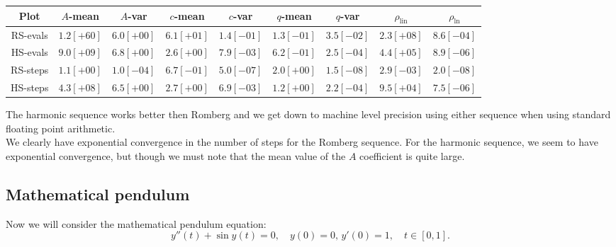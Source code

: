 \begin{table}[H]
    \centering
    \small
    \begin{tabular}{c||c|c|c|c|c|c|c|c}
Plot & \(A\)-mean & \(A\)-var & \(c\)-mean & \(c\)-var & \(q\)-mean & \(q\)-var & \(\rho_{\operatorname{lin}}\) & \(\rho_{\ln}\)\\\hline
\rowcolor{red}
RS-evals & \(1.2[+60]\) & \(6.0[+00]\) & \(6.1[+01]\) & \(1.4[-01]\) & \(1.3[-01]\) & \(3.5[-02]\) & \(2.3[+08]\) & \(8.6[-04]\) \\
\rowcolor{green}
HS-evals & \(9.0[+09]\) & \(6.8[+00]\) & \(2.6[+00]\) & \(7.9[-03]\) & \(6.2[-01]\) & \(2.5[-04]\) & \(4.4[+05]\) & \(8.9[-06]\) \\
\rowcolor{green}
RS-steps & \(1.1[+00]\) & \(1.0[-04]\) & \(6.7[-01]\) & \(5.0[-07]\) & \(2.0[+00]\) & \(1.5[-08]\) & \(2.9[-03]\) & \(2.0[-08]\) \\
\rowcolor{green}
HS-steps & \(4.3[+08]\) & \(6.5[+00]\) & \(2.7[+00]\) & \(6.9[-03]\) & \(1.2[+00]\) & \(2.2[-04]\) & \(9.5[+04]\) & \(7.5[-06]\) \\
    \end{tabular}
    \label{tab:my_label}
\end{table}

The harmonic sequence works better then Romberg and we get down to machine level precision using either sequence when using standard floating point arithmetic.\\

We clearly have exponential convergence in the number of steps for the Romberg sequence. For the harmonic sequence, we seem to have exponential convergence, but though we must note that the mean value of the \(A\) coefficient is quite large.

\subsection{Mathematical pendulum}

Now we will consider the mathematical pendulum equation:
\begin{equation}
y''(t) + \sin y(t) = 0,\quad y(0) = 0,\, y'(0) = 1, \quad t\in [0,1].
\end{equation}


